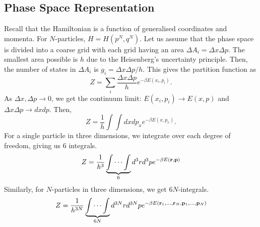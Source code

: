     \subsection{Phase Space Representation}
        Recall that the Hamiltonian is a function of generalised coordinates and momenta. For $N$-particles, $H=H(p^N,q^N)$. Let us assume that the phase space is divided into a coarse grid with each grid having an area $\Delta A_i = \Delta x\Delta p$. The smallest area possible is $h$ due to the Heisenberg's uncertainty principle. Then, the number of states in $\Delta A_i$ is $g_i = \Delta x\Delta p / h$. This gives the partition function as
        \begin{equation}
            Z = \sum_i\frac{\Delta x\Delta p}{h}e^{-\beta E(x_i,p_i)}.
        \end{equation}
        As $\Delta x, \Delta p\to0$, we get the continuum limit: $E(x_i,p_i)\to E(x,p)$ and $\Delta x\Delta p\to dxdp$. Then,
        \begin{equation}
            Z = \frac{1}{h}\int\int dxdp_xe^{-\beta E(x,p_x)}.
        \end{equation}
        For a single particle in three dimensions, we integrate over each degree of freedom, giving us 6 integrals. 
        \begin{equation}
            Z=\frac{1}{h^3}\underbrace{\int\cdots\int}_6 d^3rd^3pe^{-\beta E(\mathbf{r},\mathbf{p})}
        \end{equation}
        Similarly, for $N$-particles in three dimensions, we get $6N$-integrals.
        \begin{equation}
            Z= \frac{1}{h^{3N}}\underbrace{\int\cdots\int}_{6N} d^{3N}rd^{3N}pe^{-\beta E(\mathbf{r}_1,...,\mathbf{r}_N,\mathbf{p}_1,...,\mathbf{p}_N)}
        \end{equation}
        
